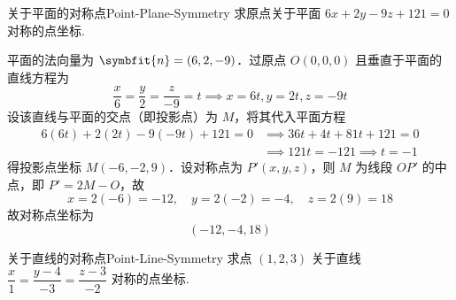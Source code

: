 \begin{problem}{关于平面的对称点}{Point-Plane-Symmetry}
    求原点关于平面 $6x + 2y - 9z + 121 = 0$ 对称的点坐标.
\end{problem}

\begin{solution}
    平面的法向量为 $\symbfit{n} = (6, 2, -9)$．过原点 $O(0, 0, 0)$ 且垂直于平面的直线方程为
    \begin{equation}
        \frac{x}{6} = \frac{y}{2} = \frac{z}{-9} = t \implies x = 6t, y = 2t, z = -9t
    \end{equation}
    设该直线与平面的交点（即投影点）为 $M$，将其代入平面方程
    \begin{equation}
        \begin{aligned}
            6(6t) + 2(2t) - 9(-9t) + 121 = 0
             & \implies 36t + 4t + 81t + 121 = 0    \\
             & \implies 121t = -121 \implies t = -1
        \end{aligned}
    \end{equation}
    得投影点坐标 $M(-6, -2, 9)$．设对称点为 $P'(x, y, z)$，则 $M$ 为线段 $OP'$ 的中点，即 $P' = 2M - O$，故
    \begin{equation}
        x = 2(-6) = -12, \quad y = 2(-2) = -4, \quad z = 2(9) = 18
    \end{equation}
    故对称点坐标为
    \begin{equation}
        \boxed{(-12, -4, 18)}
    \end{equation}
\end{solution}


\begin{problem}{关于直线的对称点}{Point-Line-Symmetry}
    求点 $(1, 2, 3)$ 关于直线 $\dfrac{x}{1} = \dfrac{y-4}{-3} = \dfrac{z-3}{-2}$ 对称的点坐标.
\end{problem}

